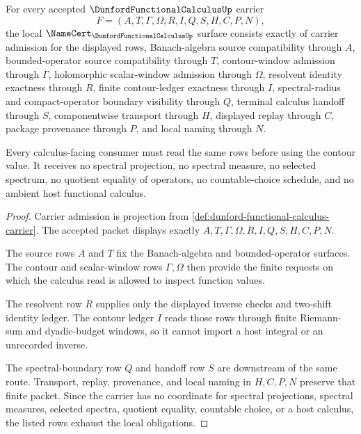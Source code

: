 \begin{theorem}
\label{thm:dunford-functional-calculus-namecert-obligations}
For every accepted $\DunfordFunctionalCalculusUp$ carrier
$$
F=(A,T,\Gamma,\Omega,R,I,Q,S,H,C,P,N),
$$
the local $\NameCert_{\DunfordFunctionalCalculusUp}$ surface consists exactly of carrier admission for the displayed rows, Banach-algebra source compatibility through $A$, bounded-operator source compatibility through $T$, contour-window admission through $\Gamma$, holomorphic scalar-window admission through $\Omega$, resolvent identity exactness through $R$, finite contour-ledger exactness through $I$, spectral-radius and compact-operator boundary visibility through $Q$, terminal calculus handoff through $S$, componentwise transport through $H$, displayed replay through $C$, package provenance through $P$, and local naming through $N$.

Every calculus-facing consumer must read the same rows before using the contour value. It receives no spectral projection, no spectral measure, no selected spectrum, no quotient equality of operators, no countable-choice schedule, and no ambient host functional calculus.
\end{theorem}
\begin{proof}
Carrier admission is projection from \autoref{def:dunford-functional-calculus-carrier}. The accepted packet displays exactly $A,T,\Gamma,\Omega,R,I,Q,S,H,C,P,N$.

The source rows $A$ and $T$ fix the Banach-algebra and bounded-operator surfaces. The contour and scalar-window rows $\Gamma,\Omega$ then provide the finite requests on which the calculus read is allowed to inspect function values.

The resolvent row $R$ supplies only the displayed inverse checks and two-shift identity ledger. The contour ledger $I$ reads those rows through finite Riemann-sum and dyadic-budget windows, so it cannot import a host integral or an unrecorded inverse.

The spectral-boundary row $Q$ and handoff row $S$ are downstream of the same route. Transport, replay, provenance, and local naming in $H,C,P,N$ preserve that finite packet. Since the carrier has no coordinate for spectral projections, spectral measures, selected spectra, quotient equality, countable choice, or a host calculus, the listed rows exhaust the local obligations.
\end{proof}


